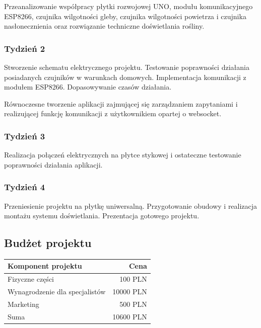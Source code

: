\documentclass[12pt]{article}
\begin{document}
Przeanalizowanie współpracy płytki rozwojowej UNO, modułu komunikacyjnego ESP8266, czujnika wilgotności gleby, czujnika wilgotności powietrza i czujnika nasłonecznienia oraz rozwiązanie techniczne doświetlania rośliny. 

\subsubsection{Tydzień 2}


Stworzenie schematu elektrycznego projektu. Testowanie poprawności działania posiadanych czujników w warunkach domowych. Implementacja komunikacji z modułem ESP8266. Dopasowywanie czasów działania.

Równoczesne tworzenie aplikacji zajmującej się zarządzaniem zapytaniami i realizującej funkcję komunikacji z użytkownikiem opartej o websocket.

\subsubsection{Tydzień 3}
Realizacja połączeń elektrycznych na płytce stykowej i ostateczne testowanie poprawności działania aplikacji.


\subsubsection{Tydzień 4}

Przeniesienie projektu na płytkę uniwersalną. Przygotowanie obudowy i realizacja montażu systemu doświetlania. Prezentacja gotowego projektu. 

\newpage
\clearpage
\newpage



\subsection{Budżet projektu}


\begin{table}[!h]
	\centering
	\begin{tabular}{l|r}
		Komponent projektu & Cena \\\hline
		
		Fizyczne części & 100 PLN \\
		
		Wynagrodzenie dla specjalistów & 10000 PLN \\
		
		Marketing & 500 PLN \\
		
		\hline
		Suma & 10600 PLN
		
	\end{tabular}
	
\end{table}
\end{document}
